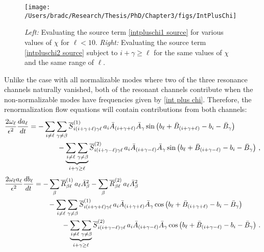 \documentclass[../PhD.tex]{subfiles}
\begin{document}
\begin{figure}[t]
\centering
	\texttt{[image: /Users/bradc/Research/Thesis/PhD/Chapter3/figs/IntPlusChi]}
	\caption[Source term for two non-normalizable modes with frequencies $\omega_\alpha = 2 \alpha + \chi$ over various choices of $\chi$]{{\it Left:} Evaluating the source term \eqref{intpluschi1 source} for various values of $\chi$ for $\ell < 10$. {\it Right:} Evaluating the source term \eqref{intpluschi2 source} subject to $i + \gamma \geq \ell$ for the same values of $\chi$ and the same range of $\ell$.}
	\label{fig: twoiplusx}
\end{figure}

Unlike the case with all normalizable modes where two of the three resonance channels naturally vanished, both of the resonant channels contribute when the non-normalizable modes have frequencies given by \eqref{int plus chi}. Therefore, the renormalization flow equations will contain contributions from both channels:
\begin{align}
\frac{2 \ol}{\epsilon^2} \frac{d a_\ell}{d t} &= - \sum_{i \neq \ell} \sum_{\gamma \neq \beta} \overline{S}^{(1)}_{i (i + \gamma + \ell) \gamma \ell} \, a_i \bar A_{(i + \gamma + \ell)} \bar A_\gamma \sin \left( b_\ell + \bar B_{(i + \gamma + \ell)} - b_i - \bar B_\gamma \right) \nonumber \\
%
& \qquad \qquad -  \underbrace{\sum_{i \neq \ell} \sum_{\gamma \neq \beta}}_{i + \gamma \geq \ell} \overline{S}^{(2)}_{i (i + \gamma - \ell) \gamma \ell} \, a_i \bar A_{(i + \gamma - \ell)} \bar A_\gamma \sin \left( b_\ell + \bar B_{(i+\gamma - \ell)} - b_i - \bar B_\gamma \right) \, ,
\end{align}
\begin{align}
\frac{2 \ol a_\ell}{\epsilon^2} \frac{d b_\ell}{dt} &=  - \sum_\beta \overline{R}^{(1)}_{\beta \ell} \, a_\ell \bar A_\beta^2 - \sum_\beta \overline{R}^{(2)}_{\beta\ell} \, a_\ell \bar A_\beta^2 \nonumber \\
%
& \qquad - \sum_{i \neq \ell} \sum_{\gamma \neq \beta} \overline{S}^{(1)}_{i (i + \gamma + \ell) \gamma \ell} \, a_i \bar A_{(i + \gamma + \ell)} \bar A_\gamma \cos \left( b_\ell + \bar B_{(i + \gamma + \ell)} - b_i - \bar B_\gamma \right) \nonumber \\
%
& \qquad \qquad -  \underbrace{\sum_{i \neq \ell} \sum_{\gamma \neq \beta}}_{i + \gamma \geq \ell} \overline{S}^{(2)}_{i (i + \gamma - \ell) \gamma \ell} \, a_i \bar A_{(i + \gamma - \ell)} \bar A_\gamma \cos \left( b_\ell + \bar B_{(i+\gamma - \ell)} - b_i - \bar B_\gamma \right) \, .
\end{align}
\end{document}
